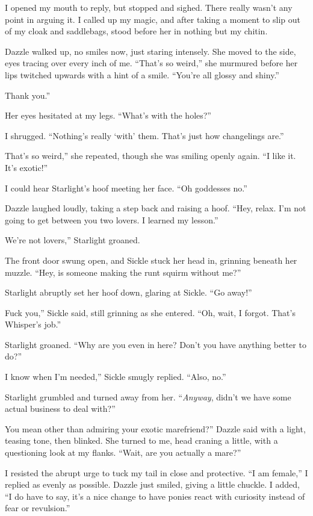 I opened my mouth to reply, but stopped and sighed. There really wasn’t any point in arguing it. I called up my magic, and after taking a moment to slip out of my cloak and saddlebags, stood before her in nothing but my chitin.

Dazzle walked up, no smiles now, just staring intensely. She moved to the side, eyes tracing over every inch of me. “That’s so weird,” she murmured before her lips twitched upwards with a hint of a smile. “You’re all glossy and shiny.”

\leavevmode{}Thank you.”

Her eyes hesitated at my legs. “What’s with the holes?”

I shrugged. “Nothing’s really ‘with’ them. That’s just how changelings are.”

\leavevmode{}That’s so weird,” she repeated, though she was smiling openly again. “I like it. It’s exotic!”

I could hear Starlight’s hoof meeting her face. “Oh goddesses no.”

Dazzle laughed loudly, taking a step back and raising a hoof. “Hey, relax. I’m not going to get between you two lovers. I learned my lesson.”

\leavevmode{}We’re not lovers,” Starlight groaned.

The front door swung open, and Sickle stuck her head in, grinning beneath her muzzle. “Hey, is someone making the runt squirm without me?”

Starlight abruptly set her hoof down, glaring at Sickle. “Go away!”

\leavevmode{}Fuck you,” Sickle said, still grinning as she entered. “Oh, wait, I forgot. That’s Whisper’s job.”

Starlight groaned. “Why are you even in here? Don’t you have anything better to do?”

\leavevmode{}I know when I’m needed,” Sickle smugly replied. “Also, no.”

Starlight grumbled and turned away from her. “\textit{Anyway}, didn’t we have some actual business to deal with?”

\leavevmode{}You mean other than admiring your exotic marefriend?” Dazzle said with a light, teasing tone, then blinked. She turned to me, head craning a little, with a questioning look at my flanks. “Wait, are you actually a mare?”

I resisted the abrupt urge to tuck my tail in close and protective. “I am female,” I replied as evenly as possible. Dazzle just smiled, giving a little chuckle. I added, “I do have to say, it’s a nice change to have ponies react with curiosity instead of fear or revulsion.”

